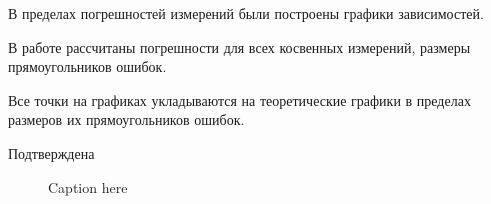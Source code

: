 В пределах погрешностей измерений были построены графики зависимостей.

В работе рассчитаны погрешности для всех косвенных измерений, размеры прямоугольников ошибок. 

Все точки на графиках укладываются на  теоретические графики в пределах размеров их прямоугольников ошибок.

Подтверждена 

\begin{figure}[h!]
	\centering
	\begin{tikzpicture}
	\hspace{-1cm}
				
	\end{tikzpicture}
	\caption{Caption here}
	\label{fig:figure1}
\end{figure}




